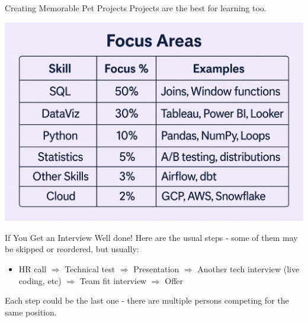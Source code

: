 \documentclass[10pt,a4paper]{article}
\begin{document}
\begin{multicols}{3}
\begin{textboxRed}{Creating Memorable Pet Projects}
Projects are the best for learning too.
\end{textboxRed}

\begin{textboxWhite}{}
	\includegraphics[width=\textwidth]{table.png}
\end{textboxWhite}

\begin{textboxGreen}{If You Get an Interview}
Well done! Here are the usual steps - some of them may be skipped or reordered, but usually:

\begin{itemize}
    \item HR call $\Rightarrow$ Technical test $\Rightarrow$ Presentation $\Rightarrow$ Another tech interview (live coding, etc) $\Rightarrow$ Team fit interview $\Rightarrow$ Offer
\end{itemize}

Each step could be the last one - there are multiple persons competing for the same position.


\end{textboxGreen}
\end{multicols}
\end{document}
